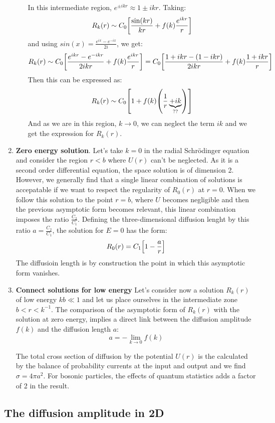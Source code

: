 \begin{enumerate}
\begin{itemize}
        In this intermediate region, $e^{\pm ikr}\approx 1\pm ikr$. Taking:
        \[R_k(r)\sim C_0\qty[\frac{\sin(kr)}{kr}+f(k)\frac{e^{ikr}}{r}]\] 
        and using $sin(x)=\frac{e^{ix}-e^{-ix}}{2i}$, we get:
        \[R_k(r)\sim C_0\qty[\frac{e^{ikr}-e^{-ikr}}{2ikr}+f(k)\frac{e^{ikr}}{r}]=C_0\qty[\frac{1+ikr-(1-ikr)}{2ikr}+f(k)\frac{1+ikr}{r}]\]
        Then this can be expressed as:
        \[R_k(r)\sim C_0\qty[1+f(k)\qty(\frac{1}{r}\underbrace{+ik}_{??})]\]
        And as we are in this region, $k\to 0$, we can neglect the term $ik$ and we get the expression for $R_{k}(r)$.
    \end{itemize}
    \item \textbf{Zero energy solution}. Let's take $k=0$ in the radial Schrödinger equation and consider the region $r<b$ where $U(r)$ can't be neglected. As it is a second order differential equation, the space solution is of dimension 2. However, we generally find that a single linear combination of solutions is accepatable if we want to respect the regularity of $R_0(r)$ at $r=0$. When we follow this solution to the point $r=b$, where $U$ becomes negligible and then the previous asymptotic form becomes relevant, this linear combination imposes the ratio $\frac{C_2}{C_1}$. Defining the three-dimensional diffusion lenght by this ratio $a=\frac{C_2}{C_1}$, the solution for $E=0$ has the form:
    \begin{equation}
        R_0(r)=C_1\qty[1-\frac{a}{r}]
    \end{equation}
    The diffusioin length is by construction the point in which this asymptotic form vanishes.
    \item \textbf{Connect solutions for low energy} Let's consider now a solution $R_k(r)$ of low energy $kb\ll 1$ and let us place ourselves in the intermediate zone $b<r<k^{-1}$. The comparison of the asymptotic form of $R_k(r)$ with the solution at zero energy, implies a direct link between the diffusion amplitude $f(k)$ and the diffusion length $a$:
    \begin{equation}
        a = -\lim_{k\to 0}f(k)
    \end{equation}

    The total cross section of diffusion by the potential $U(r)$ is the calculated by the balance of probability currents at the input and output and we find $\sigma = 4\pi a^2$. For bosonic particles, the effects of quantum statistics adds a factor of 2 in the result.
\end{enumerate}

\subsection{The diffusion amplitude in 2D}

